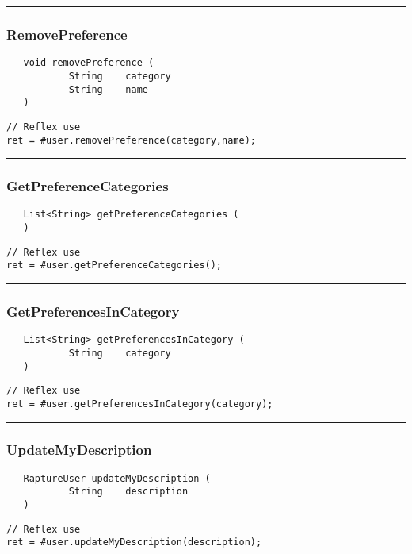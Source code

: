 \rule{15cm}{2pt}
\subsubsection{RemovePreference}
\label{Api:RemovePreference}
\begin{verbatim}
   void removePreference (
           String    category
           String    name
   )
\end{verbatim}
\begin{lstlisting}[language=reflex]
// Reflex use
ret = #user.removePreference(category,name);
\end{lstlisting}



\rule{15cm}{2pt}
\subsubsection{GetPreferenceCategories}
\label{Api:GetPreferenceCategories}
\begin{verbatim}
   List<String> getPreferenceCategories (
   )
\end{verbatim}
\begin{lstlisting}[language=reflex]
// Reflex use
ret = #user.getPreferenceCategories();
\end{lstlisting}



\rule{15cm}{2pt}
\subsubsection{GetPreferencesInCategory}
\label{Api:GetPreferencesInCategory}
\begin{verbatim}
   List<String> getPreferencesInCategory (
           String    category
   )
\end{verbatim}
\begin{lstlisting}[language=reflex]
// Reflex use
ret = #user.getPreferencesInCategory(category);
\end{lstlisting}



\rule{15cm}{2pt}
\subsubsection{UpdateMyDescription}
\label{Api:UpdateMyDescription}
\begin{verbatim}
   RaptureUser updateMyDescription (
           String    description
   )
\end{verbatim}
\begin{lstlisting}[language=reflex]
// Reflex use
ret = #user.updateMyDescription(description);
\end{lstlisting}



